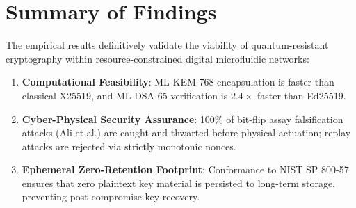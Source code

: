 \section{Summary of Findings}
The empirical results definitively validate the viability of quantum-resistant cryptography within resource-constrained digital microfluidic networks:
\begin{enumerate}
    \item \textbf{Computational Feasibility}: ML-KEM-768 encapsulation is faster than classical X25519, and ML-DSA-65 verification is $2.4\times$ faster than Ed25519.
    \item \textbf{Cyber-Physical Security Assurance}: 100\% of bit-flip assay falsification attacks (Ali et al.) are caught and thwarted before physical actuation; replay attacks are rejected via strictly monotonic nonces.
    \item \textbf{Ephemeral Zero-Retention Footprint}: Conformance to NIST SP 800-57 ensures that zero plaintext key material is persisted to long-term storage, preventing post-compromise key recovery.
\end{enumerate}
